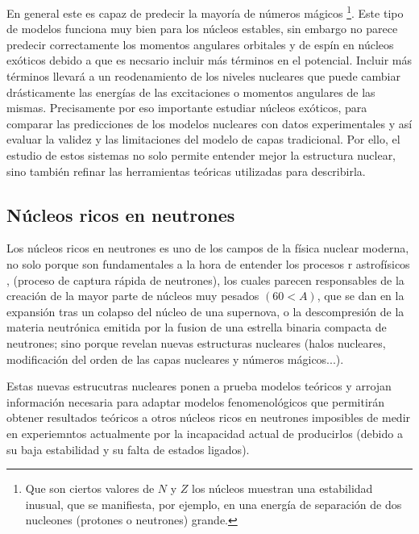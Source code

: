 En general este es capaz de predecir la mayoría de números mágicos \footnote{Que son ciertos valores de $N$ y $Z$ los núcleos muestran una estabilidad inusual, que se manifiesta, por ejemplo, en una energía de separación de dos nucleones (protones o neutrones) grande.}. Este tipo de modelos funciona muy bien para los núcleos estables, sin embargo no parece predecir correctamente los momentos angulares orbitales y de espín en núcleos exóticos debido a que es necsario incluir más términos en el potencial. Incluir más términos llevará a un reodenamiento de los niveles nucleares que puede cambiar drásticamente las energías de las excitaciones o momentos angulares de las mismas. Precisamente por eso importante estudiar núcleos exóticos, para comparar las predicciones de los modelos nucleares con datos experimentales y así evaluar la validez y las limitaciones del modelo de capas tradicional. Por ello, el estudio de estos sistemas no solo permite entender mejor la estructura nuclear, sino también refinar las herramientas teóricas utilizadas para describirla.




\subsection{Núcleos ricos en neutrones}

Los núcleos ricos en neutrones es uno de los campos de la física nuclear moderna, no solo porque son fundamentales a la hora de entender los procesos r astrofísicos \cite{THIELEMANN2011346}, (proceso de captura rápida de neutrones), los cuales parecen responsables de la creación de la mayor parte de núcleos muy pesados $(60<A)$, que se dan en la expansión tras un colapso del núcleo de una supernova, o la descompresión de la materia neutrónica emitida por la fusion de una estrella binaria compacta de neutrones; sino porque revelan nuevas estructuras nucleares (halos nucleares, modificación del orden de las capas nucleares y números mágicos...). 

Estas nuevas estrucutras nucleares ponen a prueba modelos teóricos y arrojan información necesaria para adaptar modelos fenomenológicos que permitirán obtener resultados teóricos a otros núcleos ricos en neutrones imposibles de medir en experiemntos actualmente por la incapacidad actual de producirlos (debido a su baja estabilidad y su falta de estados ligados). 


